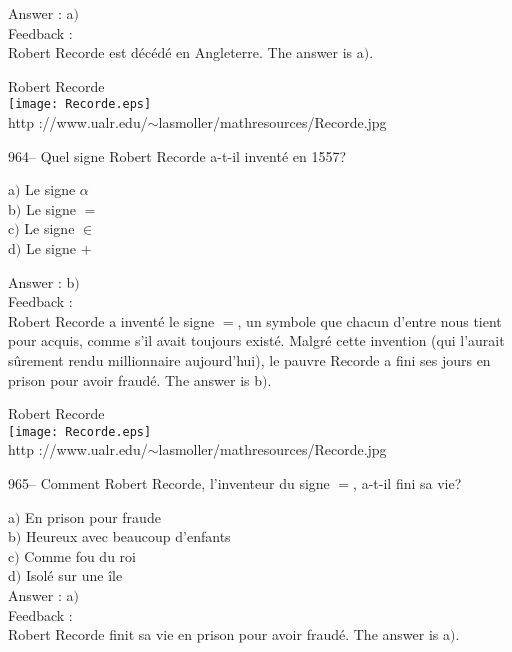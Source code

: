 ﻿\documentclass[letterpaper, 12pt]{article}
\begin{document}
Answer : a$)$\\

Feedback : \\
Robert Recorde est d\'ec\'ed\'e en Angleterre. The answer is a$)$.\\

        \begin{center}
        Robert Recorde\\
    \texttt{[image: Recorde.eps]}\\
        {\footnotesize http
://www.ualr.edu/$\sim$lasmoller/mathresources/Recorde.jpg}
    \end{center}

964-- Quel signe Robert Recorde a-t-il invent\'e en 1557?

a$)$ Le signe $\alpha$ \\
b$)$ Le signe $=$ \\
c$)$ Le signe $\in$  \\
d$)$ Le signe $+$

Answer : b$)$\\

Feedback : \\
Robert Recorde a invent\'e le signe $=$, un symbole que chacun
d'entre nous tient pour acquis, comme s'il avait toujours exist\'e.
Malgr\'e cette invention (qui l'aurait s\^urement rendu millionnaire
aujourd'hui), le pauvre Recorde a fini
ses jours en prison pour avoir fraud\'e. The answer is b$)$.\\

        \begin{center}
        Robert Recorde\\
    \texttt{[image: Recorde.eps]}\\
        {\footnotesize http
://www.ualr.edu/$\sim$lasmoller/mathresources/Recorde.jpg}
    \end{center}

965-- Comment Robert Recorde, l'inventeur du signe $=$, a-t-il fini
sa vie?

a$)$ En prison pour fraude \\
b$)$ Heureux avec beaucoup d'enfants  \\
c$)$ Comme fou du roi \\
d$)$ Isol\'e sur une \^ile \\

Answer : a$)$\\

Feedback :\\
Robert Recorde finit sa vie en prison pour avoir fraud\'e. The answer is
a$)$.\\
\end{document}
